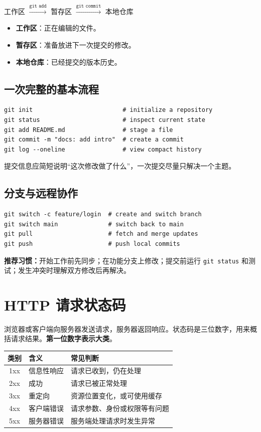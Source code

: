 \documentclass[11pt,a4paper]{ctexart}
\newcommand{\key}[1]{\textcolor{accent}{\textbf{#1}}}
\begin{document}
\begin{center}
工作区 $\xrightarrow{\texttt{git add}}$ 暂存区 $\xrightarrow{\texttt{git commit}}$ 本地仓库
\end{center}

\begin{itemize}
  \item \key{工作区}：正在编辑的文件。
  \item \key{暂存区}：准备放进下一次提交的修改。
  \item \key{本地仓库}：已经提交的版本历史。
\end{itemize}

\subsection{一次完整的基本流程}

\begin{lstlisting}
git init                         # initialize a repository
git status                       # inspect current state
git add README.md                # stage a file
git commit -m "docs: add intro"  # create a commit
git log --oneline                # view compact history
\end{lstlisting}

提交信息应简短说明“这次修改做了什么”，一次提交尽量只解决一个主题。

\subsection{分支与远程协作}

\begin{lstlisting}
git switch -c feature/login  # create and switch branch
git switch main              # switch back to main
git pull                     # fetch and merge updates
git push                     # push local commits
\end{lstlisting}

\textbf{推荐习惯：}开始工作前先同步；在功能分支上修改；提交前运行 \texttt{git status} 和测试；发生冲突时理解双方修改后再解决。

\section{HTTP 请求状态码}

浏览器或客户端向服务器发送请求，服务器返回响应。状态码是三位数字，用来概括请求结果。\key{第一位数字表示大类}。

\begin{tabularx}{\textwidth}{c l X}
\toprule
类别 & 含义 & 常见判断 \\
\midrule
1xx & 信息性响应 & 请求已收到，仍在处理 \\
2xx & 成功 & 请求已被正常处理 \\
3xx & 重定向 & 资源位置变化，或可使用缓存 \\
4xx & 客户端错误 & 请求参数、身份或权限等有问题 \\
5xx & 服务器错误 & 服务端处理请求时发生异常 \\
\bottomrule
\end{tabularx}
\end{document}

